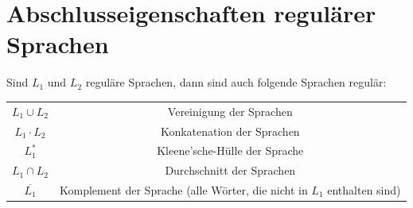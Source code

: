 \documentclass{scrreprt}
\begin{document}
\section{Abschlusseigenschaften regulärer Sprachen}
Sind $L_1$ und $L_2$ reguläre Sprachen, dann sind auch folgende Sprachen regulär:
\\\begin{tabular}{ c c }
    $L_1 \cup L_2$ & Vereinigung der Sprachen \\ 
    $L_1 \cdot L_2$ & Konkatenation der Sprachen \\  
    $L_{1}^{*}$ & Kleene'sche-Hülle der Sprache \\
    $L_1 \cap L_2$ & Durchschnitt der Sprachen \\  
    $\overline{L_1}$ & Komplement der Sprache (alle Wörter, die nicht in $L_1$ enthalten sind)      
   \end{tabular}
\end{document}
